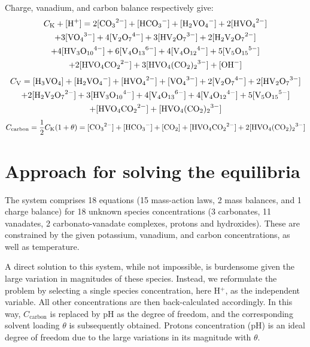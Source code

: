 \documentclass[onecolumn,aps,prl,floatfix,superscriptaddress,longbibliography,showkeys,fleqn]{revtex4-2}
\begin{document}
Charge, vanadium, and carbon balance respectively give:
\begin{multline}
	C_{\mathrm{K}}+[\ce{H+}] = 2[\ce{CO3^2-}]+[\ce{HCO3-}]+[\ce{H2VO4-}]+2[\ce{HVO4^2-}]	\\
	+3[\ce{VO4^3-}]+4[\ce{V2O7^4-}]+3[\ce{HV2O7^3-}]+ 2[\ce{H2V2O7^2-}] \\
	+4[\ce{HV3O10^4-}]+6[\ce{V4O13^6-}]+4[\ce{V4O12^4-}]+5[\ce{V5O15^5-}]	\\
	+2[\ce{HVO4CO2^2-}]+3[\ce{HVO4(CO2)2^3-}]+[\ce{OH-}]
	\label{eq:charge}
\end{multline}
\begin{multline}
	C_{\mathrm{V}} = [\ce{H3VO4}]+[\ce{H2VO4-}]+[\ce{HVO4^2-}]+[\ce{VO4^3-}]+2[\ce{V2O7^4-}]+2[\ce{HV2O7^3-}] \\
	+2[\ce{H2V2O7^2-}]+3[\ce{HV3O10^4-}]+4[\ce{V4O13^6-}]+4[\ce{V4O12^4-}]+5[\ce{V5O15^5-}] \\
	+[\ce{HVO4CO2^2-}]+[\ce{HVO4(CO2)2^3-}]
	\label{eq:vanadium}
\end{multline}
\begin{equation}
	C_{\mathrm{carbon}} = \frac{1}{2}C_{\mathrm{K}}(1+\theta) = [\ce{CO3^2-}]+[\ce{HCO3-}]+[\ce{CO2}]+[\ce{HVO4CO2^2-}]+2[\ce{HVO4(CO2)2^3-}]
	\label{eq:carbon}
\end{equation}





\section{Approach for solving the equilibria}
The system comprises 18 equations (15 mass-action laws, 2 mass balances, and 1 charge balance) for 18 unknown species concentrations (3 carbonates, 11 vanadates, 2 carbonato-vanadate complexes, protons and hydroxides). These are constrained by the given potassium, vanadium, and carbon concentrations, as well as temperature.

A direct solution to this system, while not impossible, is burdensome given the large variation in magnitudes of these species. Instead, we reformulate the problem by selecting a single species concentration, here H$^+$, as the independent variable. All other concentrations are then back-calculated accordingly. In this way, $C_{\mathrm{carbon}}$ is replaced by pH as the degree of freedom, and the corresponding solvent loading $\theta$ is subsequently obtained. Protons concentration (pH) is an ideal degree of freedom due to the large variations in its magnitude with $\theta$.
\end{document}
